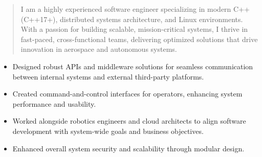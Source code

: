 



\makecvheader

\begin{quote}
  \noindent
  I am a highly experienced software engineer specializing in modern C++ (C++17+), distributed systems architecture, and Linux environments. With a passion for building scalable, mission-critical systems, I thrive in fast-paced, cross-functional teams, delivering optimized solutions that drive innovation in aerospace and autonomous systems.
\end{quote}

\par\smallskip
\noindent
\begin{minipage}{20cm}
  \begin{minipage}{9.75cm}
    \begin{itemize}
      \item Designed robust APIs and middleware solutions for seamless communication between internal systems and external third-party platforms.
      \item Created command-and-control interfaces for operators, enhancing system performance and usability.
    \end{itemize}
  \end{minipage}
  \hfill
  \begin{minipage}{9.75cm}
    \begin{itemize}
      \item Worked alongside robotics engineers and cloud architects to align software development with system-wide goals and business objectives.
      \item Enhanced overall system security and scalability through modular design.
    \end{itemize}
  \end{minipage}
\end{minipage}
\par\smallskip
\divider

